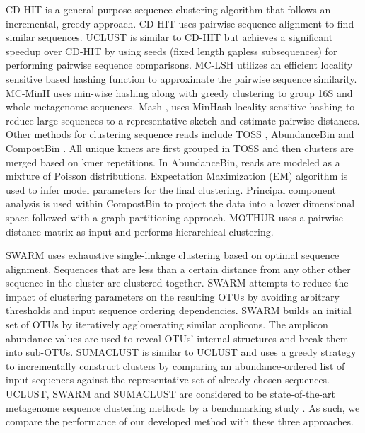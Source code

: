 \documentclass[10pt, conference, compsocconf]{IEEEtran}
\begin{document}
CD-HIT \cite{MARCDhit} is a 
general purpose sequence clustering algorithm that 
follows an incremental, greedy approach. CD-HIT uses 
pairwise sequence alignment to find similar 
sequences. UCLUST \cite{MARuclust} is similar to CD-HIT but 
achieves a significant speedup over CD-HIT by using seeds (fixed length gapless subsequences) for 
performing pairwise sequence comparisons. MC-LSH \cite{MARMetaLSH} utilizes 
an efficient locality sensitive based hashing function to 
approximate the pairwise sequence similarity. MC-MinH \cite{MARMcMinH} uses 
min-wise \cite{MARMinWise} hashing along with 
greedy clustering to group 16S and whole metagenome sequences. Mash \cite{MAROtherMinH}, uses MinHash 
locality sensitive hashing 
to reduce large sequences to a representative sketch and 
estimate
pairwise distances. Other methods for clustering sequence 
reads include TOSS \cite{MARToss}, AbundanceBin \cite{MARAbundant} and CompostBin \cite{MARCompost}. All unique 
kmers are first grouped in TOSS and then clusters are merged 
based on kmer repetitions. In AbundanceBin, reads are modeled as a 
mixture of Poisson distributions. Expectation Maximization (EM) algorithm 
is used to infer model parameters for the final clustering. Principal 
component analysis is used within CompostBin to project the data into a 
lower dimensional space
followed with a graph partitioning approach. MOTHUR \cite{MARMothur} uses a pairwise distance matrix as 
input and performs hierarchical clustering. 

%
SWARM \cite{MARSwarm2} uses exhaustive single-linkage clustering 
based on optimal sequence alignment. Sequences that are less than 
a certain distance from any other other sequence in the cluster are 
clustered together. SWARM attempts to reduce the impact of clustering 
parameters on the resulting OTUs by avoiding arbitrary 
thresholds and input sequence ordering dependencies. SWARM builds 
an initial set of OTUs  by 
iteratively agglomerating similar amplicons. The amplicon abundance values are used to reveal 
OTUs’ internal structures and 
break them into sub-OTUs.
%
SUMACLUST \cite{MARSumaclust} is similar to UCLUST and uses 
a  greedy strategy to 
incrementally construct clusters by comparing an 
abundance-ordered list of input sequences against the 
representative set of already-chosen sequences.  UCLUST, SWARM and SUMACLUST are 
considered to be 
state-of-the-art metagenome sequence clustering methods by a 
benchmarking study \cite{MARopenDeNovo}.  As such, we compare the performance of our developed method with these three approaches. 
\end{document}

